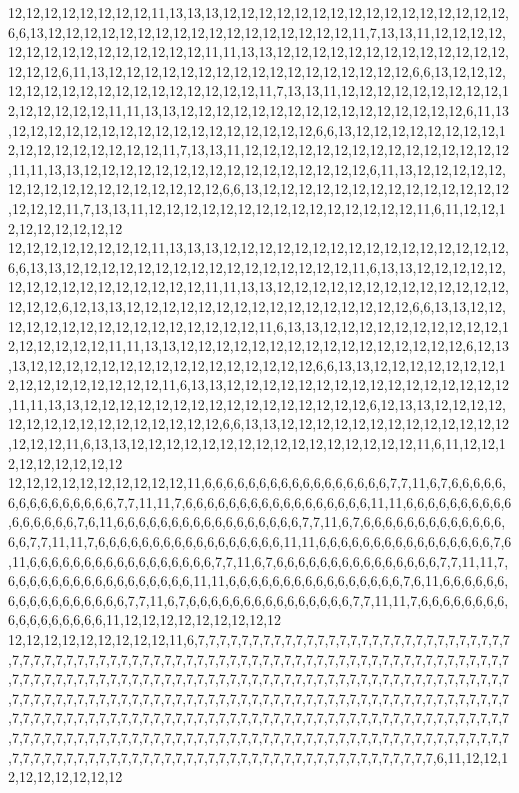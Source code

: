 12,12,12,12,12,12,12,12,11,13,13,13,12,12,12,12,12,12,12,12,12,12,12,12,12,12,12,12,6,6,13,12,12,12,12,12,12,12,12,12,12,12,12,12,12,12,12,12,11,7,13,13,11,12,12,12,12,12,12,12,12,12,12,12,12,12,12,12,11,11,13,13,12,12,12,12,12,12,12,12,12,12,12,12,12,12,12,12,6,11,13,12,12,12,12,12,12,12,12,12,12,12,12,12,12,12,12,12,6,6,13,12,12,12,12,12,12,12,12,12,12,12,12,12,12,12,12,12,11,7,13,13,11,12,12,12,12,12,12,12,12,12,12,12,12,12,12,12,11,11,13,13,12,12,12,12,12,12,12,12,12,12,12,12,12,12,12,12,6,11,13,12,12,12,12,12,12,12,12,12,12,12,12,12,12,12,12,12,6,6,13,12,12,12,12,12,12,12,12,12,12,12,12,12,12,12,12,12,11,7,13,13,11,12,12,12,12,12,12,12,12,12,12,12,12,12,12,12,11,11,13,13,12,12,12,12,12,12,12,12,12,12,12,12,12,12,12,12,6,11,13,12,12,12,12,12,12,12,12,12,12,12,12,12,12,12,12,12,6,6,13,12,12,12,12,12,12,12,12,12,12,12,12,12,12,12,12,12,11,7,13,13,11,12,12,12,12,12,12,12,12,12,12,12,12,12,12,12,11,6,11,12,12,12,12,12,12,12,12,12
12,12,12,12,12,12,12,12,11,13,13,13,12,12,12,12,12,12,12,12,12,12,12,12,12,12,12,12,6,6,13,13,12,12,12,12,12,12,12,12,12,12,12,12,12,12,12,12,11,6,13,13,12,12,12,12,12,12,12,12,12,12,12,12,12,12,12,12,11,11,13,13,12,12,12,12,12,12,12,12,12,12,12,12,12,12,12,12,6,12,13,13,12,12,12,12,12,12,12,12,12,12,12,12,12,12,12,12,6,6,13,13,12,12,12,12,12,12,12,12,12,12,12,12,12,12,12,12,11,6,13,13,12,12,12,12,12,12,12,12,12,12,12,12,12,12,12,12,11,11,13,13,12,12,12,12,12,12,12,12,12,12,12,12,12,12,12,12,6,12,13,13,12,12,12,12,12,12,12,12,12,12,12,12,12,12,12,12,6,6,13,13,12,12,12,12,12,12,12,12,12,12,12,12,12,12,12,12,11,6,13,13,12,12,12,12,12,12,12,12,12,12,12,12,12,12,12,12,11,11,13,13,12,12,12,12,12,12,12,12,12,12,12,12,12,12,12,12,6,12,13,13,12,12,12,12,12,12,12,12,12,12,12,12,12,12,12,12,6,6,13,13,12,12,12,12,12,12,12,12,12,12,12,12,12,12,12,12,11,6,13,13,12,12,12,12,12,12,12,12,12,12,12,12,12,12,12,12,11,6,11,12,12,12,12,12,12,12,12,12
12,12,12,12,12,12,12,12,12,12,11,6,6,6,6,6,6,6,6,6,6,6,6,6,6,6,6,6,7,7,11,6,7,6,6,6,6,6,6,6,6,6,6,6,6,6,6,6,7,7,11,11,7,6,6,6,6,6,6,6,6,6,6,6,6,6,6,6,6,6,11,11,6,6,6,6,6,6,6,6,6,6,6,6,6,6,6,6,7,6,11,6,6,6,6,6,6,6,6,6,6,6,6,6,6,6,6,6,7,7,11,6,7,6,6,6,6,6,6,6,6,6,6,6,6,6,6,6,7,7,11,11,7,6,6,6,6,6,6,6,6,6,6,6,6,6,6,6,6,6,11,11,6,6,6,6,6,6,6,6,6,6,6,6,6,6,6,6,7,6,11,6,6,6,6,6,6,6,6,6,6,6,6,6,6,6,6,6,7,7,11,6,7,6,6,6,6,6,6,6,6,6,6,6,6,6,6,6,7,7,11,11,7,6,6,6,6,6,6,6,6,6,6,6,6,6,6,6,6,6,11,11,6,6,6,6,6,6,6,6,6,6,6,6,6,6,6,6,7,6,11,6,6,6,6,6,6,6,6,6,6,6,6,6,6,6,6,6,7,7,11,6,7,6,6,6,6,6,6,6,6,6,6,6,6,6,6,6,7,7,11,11,7,6,6,6,6,6,6,6,6,6,6,6,6,6,6,6,6,6,11,12,12,12,12,12,12,12,12,12
12,12,12,12,12,12,12,12,12,11,6,7,7,7,7,7,7,7,7,7,7,7,7,7,7,7,7,7,7,7,7,7,7,7,7,7,7,7,7,7,7,7,7,7,7,7,7,7,7,7,7,7,7,7,7,7,7,7,7,7,7,7,7,7,7,7,7,7,7,7,7,7,7,7,7,7,7,7,7,7,7,7,7,7,7,7,7,7,7,7,7,7,7,7,7,7,7,7,7,7,7,7,7,7,7,7,7,7,7,7,7,7,7,7,7,7,7,7,7,7,7,7,7,7,7,7,7,7,7,7,7,7,7,7,7,7,7,7,7,7,7,7,7,7,7,7,7,7,7,7,7,7,7,7,7,7,7,7,7,7,7,7,7,7,7,7,7,7,7,7,7,7,7,7,7,7,7,7,7,7,7,7,7,7,7,7,7,7,7,7,7,7,7,7,7,7,7,7,7,7,7,7,7,7,7,7,7,7,7,7,7,7,7,7,7,7,7,7,7,7,7,7,7,7,7,7,7,7,7,7,7,7,7,7,7,7,7,7,7,7,7,7,7,7,7,7,7,7,7,7,7,7,7,7,7,7,7,7,7,7,7,7,7,7,7,7,7,7,7,7,7,7,7,7,7,7,7,7,7,7,7,7,7,7,7,7,7,7,7,7,7,7,7,7,7,7,7,7,7,7,7,7,7,7,7,7,7,7,7,6,11,12,12,12,12,12,12,12,12,12

